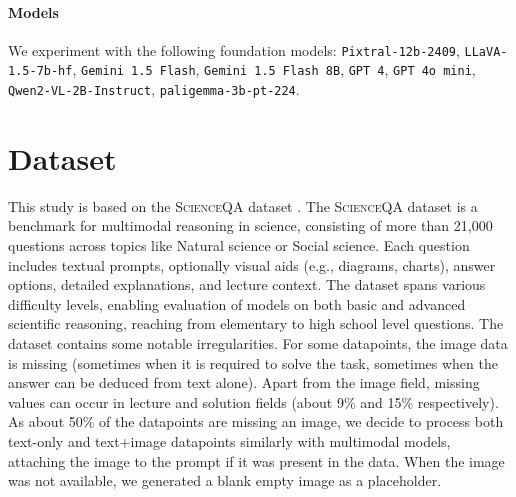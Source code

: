 \documentclass{article}
\begin{document}
\paragraph{Models} We experiment with the following foundation models: 
\texttt{Pixtral-12b-2409}, \texttt{LLaVA-1.5-7b-hf}, \texttt{Gemini 1.5 Flash}, \texttt{Gemini 1.5 Flash 8B}, \texttt{GPT 4}, \texttt{GPT 4o mini}, %
\texttt{Qwen2-VL-2B-Instruct}, \texttt{paligemma-3b-pt-224}.

\section{Dataset}
\label{dataset}
This study is based on the \textsc{ScienceQA} dataset \cite{lu2022learn}. The \textsc{ScienceQA} dataset is a benchmark for multimodal reasoning in science, consisting of more than 21,000 questions across topics like Natural science or Social science. 
Each question includes textual prompts, optionally visual aids (e.g., diagrams, charts), answer options, detailed explanations, and lecture context. The dataset spans various difficulty levels, enabling evaluation of models on both basic and advanced scientific reasoning, reaching from elementary to high school level questions.
The dataset contains some notable irregularities. For some datapoints, the image data is missing (sometimes when it is required to solve the task, sometimes when the answer can be deduced from text alone).
Apart from the image field, missing values can occur in lecture and solution fields (about 9\% and 15\% respectively). As about 50\% of the datapoints are missing an image, we decide to process both text-only and text+image datapoints similarly with multimodal models, attaching the image to the prompt if it was present in the data. When the image was not available, we generated a blank empty image as a placeholder. 
\end{document}
